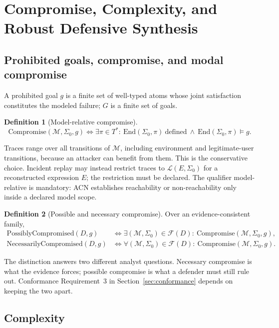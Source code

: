 \documentclass[11pt,letterpaper]{article}
\theoremstyle{definition}
\newtheorem{definition}{Definition}
\newcommand{\St}{\Sigma}
\newcommand{\End}{\mathrm{End}}
\newcommand{\Lang}{\mathcal{L}}
\newcommand{\Fam}{\mathcal{F}}
\newcommand{\Mod}{\mathcal{M}}
\newcommand{\Comp}{\mathrm{Compromise}}
\begin{document}
\section{Compromise, Complexity, and Robust Defensive Synthesis}\label{sec:synth}

\subsection{Prohibited goals, compromise, and modal compromise}

A prohibited goal $g$ is a finite set of well-typed atoms whose joint satisfaction constitutes the modeled failure; $G$ is a finite set of goals.

\begin{definition}[Model-relative compromise]
\begin{equation}\label{eq:comp}
\Comp(\Mod,\St_0,g)\iff \exists\pi\in T^{*}:\ \End(\St_0,\pi)\ \text{defined}\ \wedge\ \End(\St_0,\pi)\models g .
\end{equation}
\end{definition}
Traces range over all transitions of $\Mod$, including environment and legitimate-user transitions, because an attacker can benefit from them. This is the conservative choice. Incident replay may instead restrict traces to $\Lang(E,\St_0)$ for a reconstructed expression $E$; the restriction must be declared. The qualifier model-relative is mandatory: ACN establishes reachability or non-reachability only inside a declared model scope.

\begin{definition}[Possible and necessary compromise]
Over an evidence-consistent family,
\begin{align}
\mathrm{PossiblyCompromised}(D,g)&\iff \exists(\Mod,\St_0)\in\Fam(D):\ \Comp(\Mod,\St_0,g),\\
\mathrm{NecessarilyCompromised}(D,g)&\iff \forall(\Mod,\St_0)\in\Fam(D):\ \Comp(\Mod,\St_0,g).\label{eq:modal}
\end{align}
\end{definition}
The distinction answers two different analyst questions. Necessary compromise is what the evidence forces; possible compromise is what a defender must still rule out. Conformance Requirement~3 in Section~\ref{sec:conformance} depends on keeping the two apart.

\subsection{Complexity}\label{sec:complexity}
\end{document}
